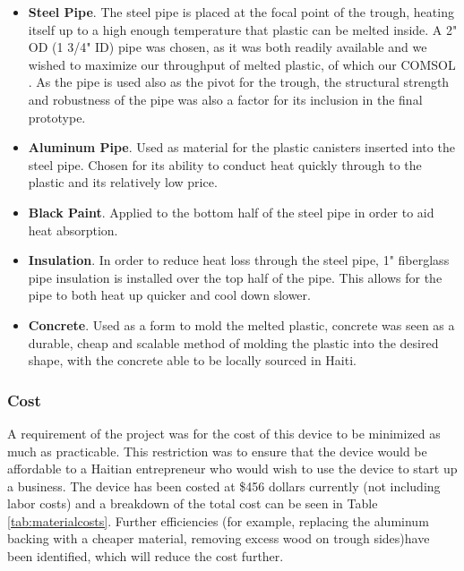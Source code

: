 \documentclass[11pt,english]{article}
\begin{document}
\begin{itemize}
\item \textbf{Steel Pipe}. The steel pipe is placed at the focal point of the trough, heating itself up to a high enough temperature that plastic can be melted inside. A 2" OD (1 3/4" ID) pipe was chosen, as it was both readily available and we wished to maximize our throughput of melted plastic, of which our COMSOL  . As the pipe is used also as the pivot for the trough, the structural strength and robustness of the pipe was also a factor for its inclusion in the final prototype.    
\item \textbf{Aluminum Pipe}. Used as material for the plastic canisters inserted into the steel pipe. Chosen for its ability to conduct heat quickly through to the plastic and its relatively low price. 
\item \textbf{Black Paint}. Applied to the bottom half of the steel pipe in order to aid heat absorption. 
\item \textbf{Insulation}. In order to reduce heat loss through the steel pipe, 1" fiberglass pipe insulation is installed over the top half of the pipe. This allows for the pipe to both heat up quicker and cool down slower. 
\item \textbf{Concrete}. Used as a form to mold the melted plastic, concrete was seen as a durable, cheap and scalable method of molding the plastic into the desired shape, with the concrete able to be locally sourced in Haiti.  
 

\end{itemize}
\newpage
\subsubsection*{Cost}

A requirement of the project was for the cost of this device to be minimized as much as practicable. This restriction was to ensure that the device would be affordable to a Haitian entrepreneur who would wish to use the device to start up a business. The device has been costed at \$456 dollars currently (not including labor costs) and a breakdown of the total cost can be seen in Table \ref{tab:materialcosts}. Further efficiencies (for example, replacing the aluminum backing with a cheaper material, removing excess wood on trough sides)have been identified, which will reduce the cost further. 
\end{document}
